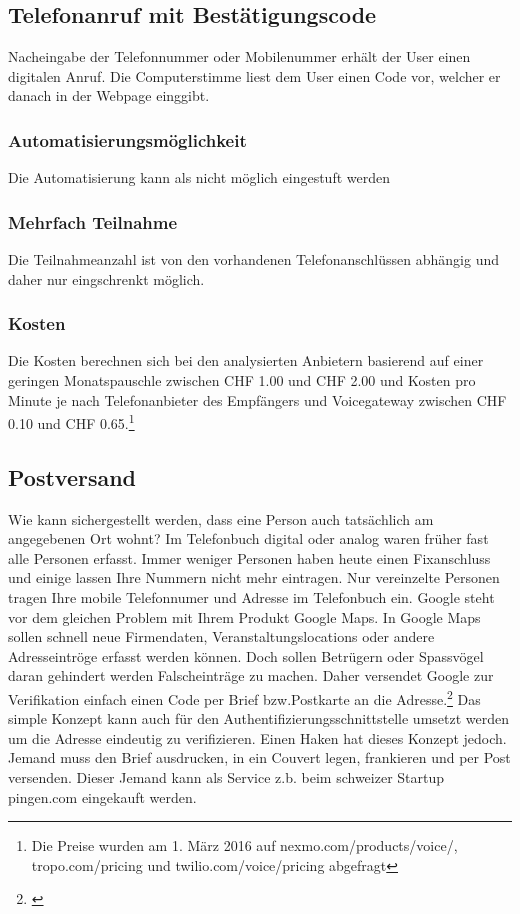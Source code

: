 \subsection{Telefonanruf mit
Bestätigungscode}\label{telefonanruf-mit-bestuxe4tigungscode}

Nacheingabe der Telefonnummer oder Mobilenummer erhält der User einen
digitalen Anruf. Die Computerstimme liest dem User einen Code vor,
welcher er danach in der Webpage einggibt.

\subsubsection{Automatisierungsmöglichkeit}\label{automatisierungsmuxf6glichkeit-2}

Die Automatisierung kann als nicht möglich eingestuft werden

\subsubsection{Mehrfach Teilnahme}\label{mehrfach-teilnahme-2}

Die Teilnahmeanzahl ist von den vorhandenen Telefonanschlüssen abhängig
und daher nur eingschrenkt möglich.

\subsubsection{Kosten}\label{kosten-2}

Die Kosten berechnen sich bei den analysierten Anbietern basierend auf
einer geringen Monatspauschle zwischen CHF 1.00 und CHF 2.00 und Kosten
pro Minute je nach Telefonanbieter des Empfängers und Voicegateway
zwischen CHF 0.10 und CHF 0.65.\footnote{Die Preise wurden am 1. März
  2016 auf nexmo.com/products/voice/, tropo.com/pricing und
  twilio.com/voice/pricing abgefragt}

\subsection{Postversand}\label{postversand}

Wie kann sichergestellt werden, dass eine Person auch tatsächlich am
angegebenen Ort wohnt? Im Telefonbuch digital oder analog waren früher
fast alle Personen erfasst. Immer weniger Personen haben heute einen
Fixanschluss und einige lassen Ihre Nummern nicht mehr eintragen. Nur
vereinzelte Personen tragen Ihre mobile Telefonnumer und Adresse im
Telefonbuch ein. Google steht vor dem gleichen Problem mit Ihrem Produkt
Google Maps. In Google Maps sollen schnell neue Firmendaten,
Veranstaltungslocations oder andere Adresseintröge erfasst werden
können. Doch sollen Betrügern oder Spassvögel daran gehindert werden
Falscheinträge zu machen. Daher versendet Google zur Verifikation
einfach einen Code per Brief bzw.Postkarte an die Adresse.\footnote{\autocite{googlebusiness}}
Das simple Konzept kann auch für den Authentifizierungsschnittstelle
umsetzt werden um die Adresse eindeutig zu verifizieren. Einen Haken hat
dieses Konzept jedoch. Jemand muss den Brief ausdrucken, in ein Couvert
legen, frankieren und per Post versenden. Dieser Jemand kann als Service
z.b. beim schweizer Startup pingen.com eingekauft werden.

